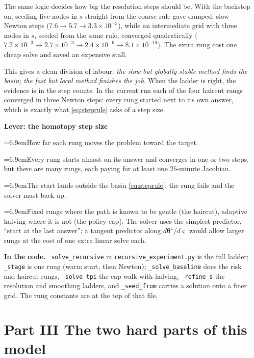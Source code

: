 \documentclass[10pt,a4paper]{article}
\newcommand{\leverrow}[2]{\par\noindent\hangindent=6.9em\hangafter=1\makebox[6.9em][l]{\textit{#1}}#2}
\newenvironment{lever}[1]{\par\begin{framed}\small\noindent\textcolor{levcol}{\textbf{Lever: #1}}\par\vspace{2pt}}{\end{framed}}
\newenvironment{incode}{\begin{leftbar}\small\noindent\textcolor{codecol}{\textbf{In the code.}}\ }{\end{leftbar}}
\theoremstyle{plain}
\theoremstyle{remark}
\newcommand{\pol}{\bm{\theta}}
\newcommand{\file}[1]{\textcolor{codecol}{\texttt{#1}}}
\newcommand{\code}[1]{\texttt{#1}}
\begin{document}
The same logic decides how big the resolution steps should be. With the backstop on, seeding five
nodes in $s$ straight from the coarse rule gave damped, slow Newton steps
($7.6\to5.7\to3.3\times10^{-3}$), while an intermediate grid with three nodes in $s$, seeded from the
same rule, converged quadratically ($7.2\times10^{-3}\to2.7\times10^{-3}\to2.4\times10^{-6}\to
8.1\times10^{-10}$). The extra rung cost one cheap solve and saved an expensive stall.

This gives a clean division of labour: \emph{the slow but globally stable method finds the basin;
the fast but local method finishes the job.} When the ladder is right, the evidence is in the step
counts. In the current run each of the four haircut rungs converged in three Newton steps: every rung
started next to its own answer, which is exactly what \eqref{eq:steprule} asks of a step size.

\begin{lever}{the homotopy step size}
\leverrow{Controls}{How far each rung moves the problem toward the target.}
\leverrow{Push small}{Every rung starts almost on its answer and converges in one or two steps, but
there are many rungs, each paying for at least one $25$-minute Jacobian.}
\leverrow{Push large}{The start lands outside the basin \eqref{eq:steprule}; the rung fails and the
solver must back up.}
\leverrow{Here}{Fixed rungs where the path is known to be gentle (the haircut), adaptive halving
where it is not (the policy cap). The solver uses the simplest predictor, ``start at the last
answer''; a tangent predictor along $d\pol^\star/d\varsigma$ would allow larger rungs at the cost of
one extra linear solve each.}
\end{lever}

\begin{incode}
\code{solve\_recursive} in \file{recursive\_experiment.py} is the full ladder; \code{\_stage} is one
rung (warm start, then Newton); \code{\_solve\_baseline} does the risk and haircut rungs,
\code{\_solve\_tpi} the cap walk with halving, \code{\_refine\_s} the resolution and smoothing
ladders, and \code{\_seed\_from} carries a solution onto a finer grid. The rung constants are at
the top of that file.
\end{incode}

\part*{Part III \quad The two hard parts of this model}
\end{document}

